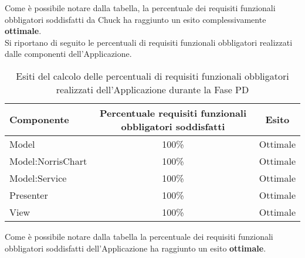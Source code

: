 					Come è possibile notare dalla tabella, la percentuale dei requisiti funzionali obbligatori soddisfatti da Chuck ha raggiunto un esito complessivamente \textbf{ottimale}.\\
					Si riportano di seguito le percentuali di requisiti funzionali obbligatori realizzati dalle componenti dell'Applicazione.
					\begin{table}[H]
						\centering
							\begin{tabu}{| l | c | c |}
								\hline
								Componente	& Percentuale requisiti funzionali obbligatori soddisfatti	& Esito		\\ \hline \hline
								Model				&   100\% 	& Ottimale \\ \hline
								Model:NorrisChart	&   100\% 	& Ottimale  \\ \hline
								Model:Service 		& 	100\%	& Ottimale   \\ \hline
								Presenter  			& 	100\%	& Ottimale  \\ \hline
								View  				& 	100\%	& Ottimale  \\ \hline
							\end{tabu}
						\caption{Esiti del calcolo delle percentuali di requisiti funzionali obbligatori realizzati dell'Applicazione durante la Fase PD}
					\end{table}
					Come è possibile notare dalla tabella la percentuale dei requisiti funzionali obbligatori soddisfatti dell'Applicazione ha raggiunto un esito \textbf{ottimale}.

